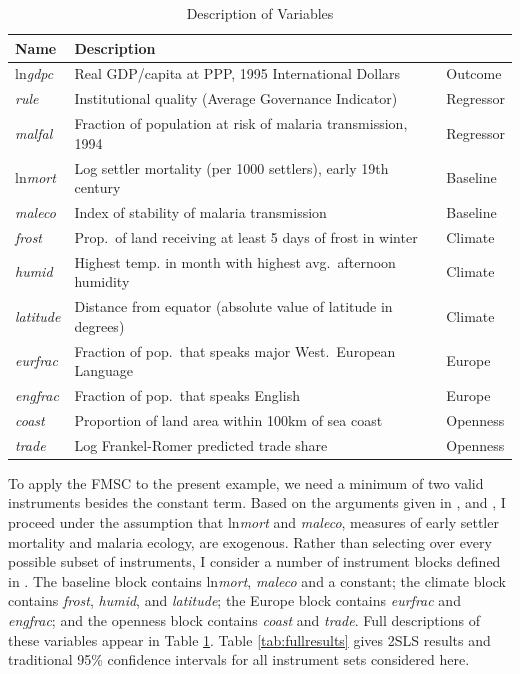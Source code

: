 \documentclass[12pt]{article}
\theoremstyle{definition}
\begin{document}
\begin{table}[!tbp]
\caption{Description of Variables}
\small
\label{tab:desc}
\begin{center}
\begin{tabular}{lll}
\hline \hline
Name& Description &\\
\hline
ln\emph{gdpc}&Real GDP/capita at PPP, 1995 International Dollars &Outcome\\
\emph{rule}&Institutional quality (Average Governance Indicator)&Regressor\\
\emph{malfal}&Fraction of population at risk of malaria transmission, 1994&Regressor\\
ln\emph{mort}&Log settler mortality (per 1000 settlers), early 19th century&Baseline\\
\emph{maleco}&Index of stability of malaria transmission&Baseline\\
\emph{frost}&Prop.\ of land receiving at least 5 days of frost in winter&Climate\\
\emph{humid}&Highest temp. in month with highest avg.\ afternoon humidity&Climate\\
\emph{latitude}&Distance from equator (absolute value of latitude in degrees)&Climate \\
\emph{eurfrac}&Fraction of pop.\ that speaks major West.\ European Language&Europe \\
\emph{engfrac}&Fraction of pop.\ that speaks English&Europe\\
\emph{coast}&Proportion of land area within 100km of sea coast&Openness\\
\emph{trade}&Log Frankel-Romer predicted trade share&Openness\\
\hline
\end{tabular}
\end{center}
\end{table}

To apply the FMSC to the present example, we need a minimum of two valid instruments besides the constant term. Based on the arguments given in \cite{Acemoglu}, \cite{Carstensen2006} and \cite{Sachs}, I proceed under the assumption that ln\emph{mort} and \emph{maleco}, measures of early settler mortality and malaria ecology, are exogenous. Rather than selecting over every possible subset of instruments, I consider a number of instrument blocks defined in \cite{Carstensen2006}. The baseline block contains ln\emph{mort}, \emph{maleco} and a constant; the climate block contains \emph{frost}, \emph{humid}, and \emph{latitude}; the Europe block contains \emph{eurfrac} and \emph{engfrac}; and the openness block contains \emph{coast} and \emph{trade}. Full descriptions of these variables appear in Table \ref{tab:desc}. Table \ref{tab:fullresults} gives 2SLS results and traditional 95\% confidence intervals for all instrument sets considered here.
\end{document}
